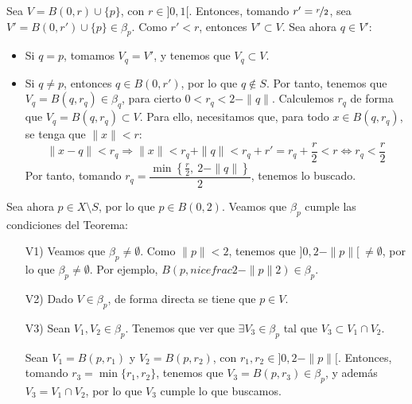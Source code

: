 \documentclass[12pt]{article}
\begin{document}
\begin{ejercicio}[5 puntos]
\begin{enumerate}
\begin{enumerate}
            Sea $V=B(0, r) \cup \{p\}$, con $r\in ]0,1[$. Entonces, tomando $r' = \nicefrac{r}{2}$, sea
            $V'=B(0, r') \cup \{p\} \in \beta_p$. Como $r' < r$, entonces $V' \subset V$. Sea ahora $q\in V'$:
            \begin{itemize}
              \item Si $q=p$, tomamos $V_q = V'$, y tenemos que $V_q \subset V$.
              \item Si $q\neq p$, entonces $q\in B(0, r')$, por lo que $q\notin S$. Por tanto, tenemos que
              $V_q = B(q, r_q) \in \beta_q$, para cierto $0<r_q < 2 - \|q\|$. Calculemos $r_q$ de forma que
              $V_q = B(q, r_q) \subset V$. Para ello, necesitamos que, para todo $x\in B(q, r_q)$, se tenga que $\|x\|<r$:
              \begin{equation*}
                \|x-q\| < r_q \Longrightarrow \|x\| < r_q + \|q\| < r_q + r' = r_q + \frac{r}{2} < r
                \Longleftrightarrow r_q < \frac{r}{2}
              \end{equation*}
              Por tanto, tomando $r_q = \dfrac{\min\left\{\frac{r}{2},~2 - \|q\|\right\}}{2}$, tenemos lo buscado.
            \end{itemize}
          \end{enumerate}

          Sea ahora $p\in X\setminus S$, por lo que $p\in B(0,2)$. Veamos que $\beta_p$ cumple las condiciones
            del Teorema:
            \begin{enumerate}
              \item[V1)] Veamos que $\beta_p \neq \emptyset$. Como $\|p\|<2$,
              tenemos que $]0,2-\|p\|[~\neq \emptyset$, por lo que $\beta_p \neq \emptyset$.
              Por ejemplo, $B(p,nicefrac{2-\|p\|}{2}) \in \beta_p$.

              \item[V2)] Dado $V\in \beta_p$, de forma directa se tiene que $p\in V$.
              
              \item[V3)] Sean $V_1, V_2 \in \beta_p$. Tenemos que ver que $\exists V_3\in \beta_p$ tal que
              $V_3 \subset V_1 \cap V_2$.

              Sean $V_1=B(p, r_1)$ y $V_2=B(p, r_2)$, con $r_1, r_2 \in ]0,2-\|p\|[$.
              Entonces, tomando $r_3 = \min\{r_1, r_2\}$, tenemos que $V_3=B(p, r_3) \in \beta_p$,
              y además $V_3 = V_1 \cap V_2$, por lo que $V_3$ cumple lo que buscamos.


\end{enumerate}
\end{enumerate}
\end{ejercicio}
\end{document}
